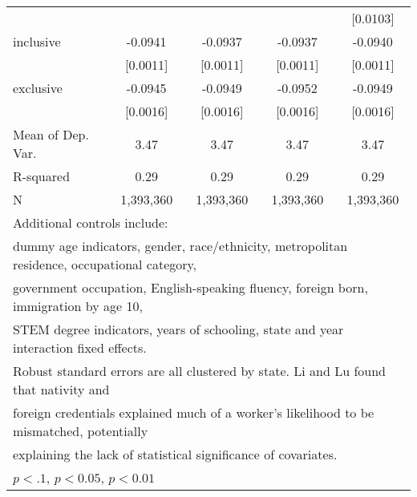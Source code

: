 \begin{table}[htbp]
\begin{tabular}{l*{4}{c}}
                    &                     &                     &                     &    [0.0103]         \\
\addlinespace
inclusive           &     -0.0941\sym{***}&     -0.0937\sym{***}&     -0.0937\sym{***}&     -0.0940\sym{***}\\
                    &    [0.0011]         &    [0.0011]         &    [0.0011]         &    [0.0011]         \\
\addlinespace
exclusive           &     -0.0945\sym{***}&     -0.0949\sym{***}&     -0.0952\sym{***}&     -0.0949\sym{***}\\
                    &    [0.0016]         &    [0.0016]         &    [0.0016]         &    [0.0016]         \\
\midrule
Mean of Dep. Var.   &        3.47         &        3.47         &        3.47         &        3.47         \\
R-squared           &        0.29         &        0.29         &        0.29         &        0.29         \\
N                   &   1,393,360         &   1,393,360         &   1,393,360         &   1,393,360         \\
\bottomrule
\multicolumn{5}{l}{\footnotesize Additional controls include:}\\
\multicolumn{5}{l}{\footnotesize dummy age indicators, gender, race/ethnicity, metropolitan residence, occupational category,}\\
\multicolumn{5}{l}{\footnotesize government occupation, English-speaking fluency, foreign born, immigration by age 10,}\\
\multicolumn{5}{l}{\footnotesize STEM degree indicators, years of schooling, state and year interaction fixed effects.}\\
\multicolumn{5}{l}{\footnotesize Robust standard errors are all clustered by state. Li and Lu found that nativity and}\\
\multicolumn{5}{l}{\footnotesize foreign credentials explained much of a worker's likelihood to be mismatched, potentially}\\
\multicolumn{5}{l}{\footnotesize explaining the lack of statistical significance of covariates.}\\
\multicolumn{5}{l}{\footnotesize \sym{*} \(p<.1\), \sym{**} \(p<0.05\), \sym{***} \(p<0.01\)}\\
\end{tabular}
\end{table}
